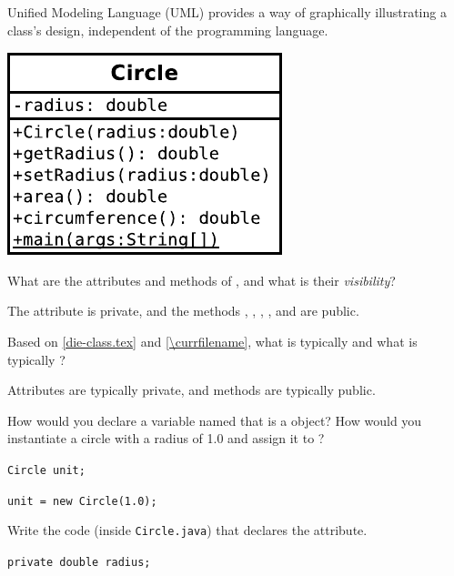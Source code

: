 
Unified Modeling Language (UML) provides a way of graphically illustrating a class’s design, independent of the programming language.

\begin{center}
\includegraphics{Circle.pdf}
\end{center}




\Q What are the attributes and methods of , and what is their \emph{visibility}?

\begin{answer}
The attribute  is private, and the methods , , , , and  are public.
\end{answer}


\Q Based on \ref{die-class.tex} and \ref{\currfilename}, what is typically  and what is typically ?

\begin{answer}
Attributes are typically private, and methods are typically public.
\end{answer}


\Q How would you declare a variable named  that is a  object?
How would you instantiate a circle with a radius of 1.0 and assign it to ?

\begin{answer}
\tt Circle unit;

\tt unit = new Circle(1.0);
\end{answer}


\Q Write the code (inside {\tt Circle.java}) that declares the  attribute.

\begin{answer}
\tt private double radius;
\end{answer}


